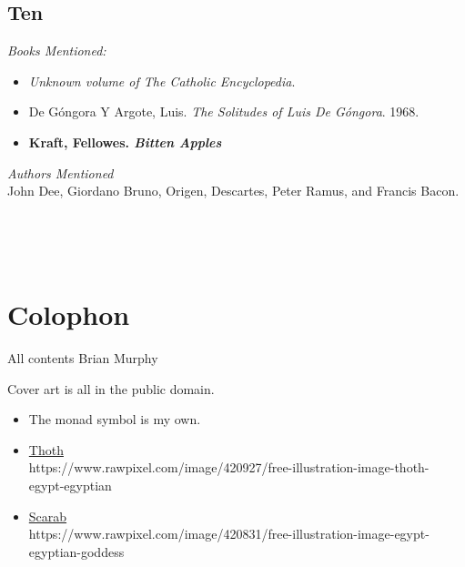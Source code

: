 \documentclass[twoside,10pt]{report}
\newcommand\fleuron{\begin{turn}{45}\Large \ding{166}\end{turn}}
\newcommand\doublefleuron{%
	\reflectbox{\fleuron}\AC\staveXLIX\reflectbox{\AC}\fleuron}
\newcommand\fleuronbar{%
	{\huge\LinearACCCXIII}\xrfill[1.3ex]{1pt}\doublefleuron\xrfill[1.3ex]{1pt}\reflectbox{\huge\LinearACCCXIII}}
\newcommand\blankpage{%
    \null
    \thispagestyle{empty}%
    \addtocounter{page}{-1}%
    \newpage%
    \pagestyle{fancy}}
\newcommand\nbvspace[1][3]{\vspace*{\stretch{#1}}}
\begin{document}
\section{Ten}
\textit{Books Mentioned:}
\begin{itemize}
\item \textit{Unknown volume of The Catholic Encyclopedia}.\cite{Herbermann1908}
\item De Góngora Y Argote, Luis. \textit{The Solitudes of Luis De Góngora}. 1968.\cite{DeGongoraYArgote1968}
\item \textbf{Kraft, Fellowes. \textit{Bitten Apples}}
\end{itemize}
\textit{Authors Mentioned}\\
John Dee, Giordano Bruno, Origen, Descartes, Peter Ramus, and Francis Bacon.

\begin{center}
\vfill
\shadowoffset{1pt}
\shadowtext{%
{\color{Mahogany}\fontsize{60}{64}\staveL}}\\
\nbvspace[1]
\end{center}




\begin{center}
\vfill
\shadowoffset{1pt}
\shadowtext{%
{\color{Mahogany}\fontsize{60}{64}\staveLVI}}\\
\nbvspace[1]
\end{center}

\chapter{Colophon}
All contents   Brian Murphy\\
\bigskip

Cover art is all in the public domain.

\begin{itemize}
\item The monad symbol is my own.
\item \href{https://www.rawpixel.com/image/420927/free-illustration-image-thoth-egypt-egyptian}{Thoth}\\
https://www.rawpixel.com/image/420927/free-illustration-image-thoth-\\egypt-egyptian
\item \href{https://www.rawpixel.com/image/420831/free-illustration-image-egypt-egyptian-goddess}{Scarab}\\
https://www.rawpixel.com/image/420831/free-illustration-image-egypt-\\egyptian-goddess
\end{itemize}

\begin{center}
\vfill
\shadowoffset{1pt}
\shadowtext{%
{\color{Mahogany}\fontsize{60}{64}\staveLVIII}}\\
\nbvspace[1]
\end{center}

\afterpage{\blankpage}


\end{document}
